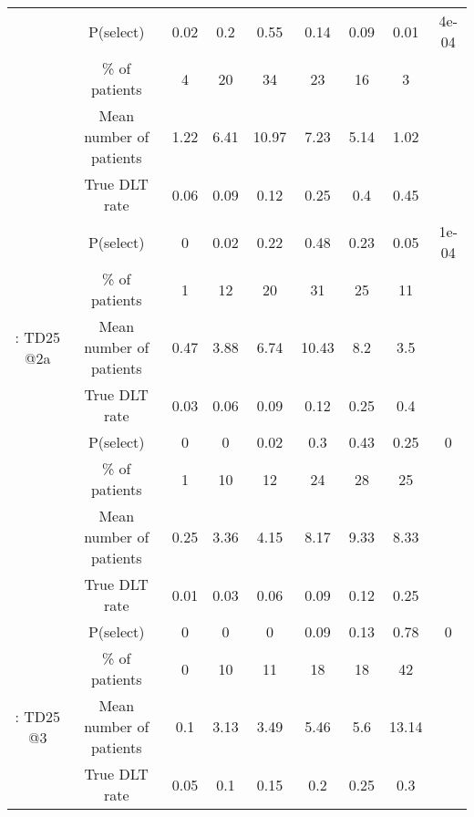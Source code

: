 \begin{table}[h!]
\begin{singlespace}
{\begin{tabular}[t]{ccccccccc}
				\rowcolor{gray!6}   & P(select) & 0.02 & 0.2 & 0.55 & 0.14 & 0.09 & 0.01 & 4e-04\\
				
				\rowcolor{gray!6}   & \% of patients & 4 & 20 & 34 & 23 & 16 & 3 & \\
				
				\rowcolor{gray!6}  \multirow{-4}{*}{\centering\arraybackslash 3: TD25 @1} & Mean number of patients & 1.22 & 6.41 & 10.97 & 7.23 & 5.14 & 1.02 & \\
				\cmidrule{1-9}
				& True DLT rate & 0.06 & 0.09 & 0.12 & 0.25 & 0.4 & 0.45 & \\
				
				& P(select) & 0 & 0.02 & 0.22 & 0.48 & 0.23 & 0.05 & 1e-04\\
				
				& \% of patients & 1 & 12 & 20 & 31 & 25 & 11 & \\
				
				\multirow{-4}{*}{\centering\arraybackslash 4: TD25 @2a} & Mean number of patients & 0.47 & 3.88 & 6.74 & 10.43 & 8.2 & 3.5 & \\
				\cmidrule{1-9}
				\rowcolor{gray!6}   & True DLT rate & 0.03 & 0.06 & 0.09 & 0.12 & 0.25 & 0.4 & \\
				
				\rowcolor{gray!6}   & P(select) & 0 & 0 & 0.02 & 0.3 & 0.43 & 0.25 & 0\\
				
				\rowcolor{gray!6}   & \% of patients & 1 & 10 & 12 & 24 & 28 & 25 & \\
				
				\rowcolor{gray!6}  \multirow{-4}{*}{\centering\arraybackslash 5: TD25 @2b} & Mean number of patients & 0.25 & 3.36 & 4.15 & 8.17 & 9.33 & 8.33 & \\
				\cmidrule{1-9}
				& True DLT rate & 0.01 & 0.03 & 0.06 & 0.09 & 0.12 & 0.25 & \\
				
				& P(select) & 0 & 0 & 0 & 0.09 & 0.13 & 0.78 & 0\\
				
				& \% of patients & 0 & 10 & 11 & 18 & 18 & 42 & \\
				
				\multirow{-4}{*}{\centering\arraybackslash 6: TD25 @3} & Mean number of patients & 0.1 & 3.13 & 3.49 & 5.46 & 5.6 & 13.14 & \\
				\cmidrule{1-9}
				\rowcolor{gray!6}   & True DLT rate & 0.05 & 0.1 & 0.15 & 0.2 & 0.25 & 0.3 & \\
				

\end{tabular}}
\end{singlespace}
\end{table}
